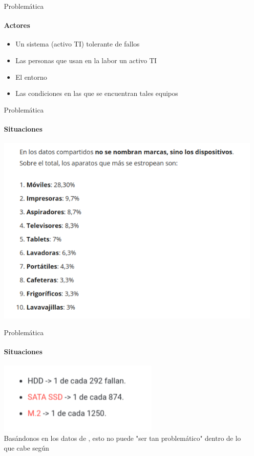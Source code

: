\begin{frame}{Problemática}
    \framesubtitle{Actores}
    \begin{itemize}
        \item Un sistema (activo TI) tolerante de fallos \parencite{rodriguez} 
        \pause
        \item Las personas que usan en la labor un activo TI 
        \pause
        \item El entorno \pause
        \item Las condiciones en las que se encuentran tales equipos
    \end{itemize}
\end{frame}
\begin{frame}{Problemática}
    \framesubtitle{Situaciones}
    \includegraphics[height=0.75\textheight]{./pictures/statistics.png}
\end{frame}
\begin{frame}{Problemática}
    \framesubtitle{Situaciones}
    \begin{center}
        \includegraphics[width=0.6\textwidth]{./pictures/hardware.png} \\
        Basándonos en los datos de \textcite{asus}, esto no puede
        "ser tan problemático" dentro de lo que cabe según
        \textcite{computerhoy}
    \end{center}
\end{frame}
